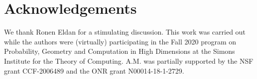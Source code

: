 \documentclass[11pt]{article}
\numberwithin{equation}{section}
\theoremstyle{myremark}
\theoremstyle{myremark}
\theoremstyle{myexample}
\newcommand{\1}{\mathbf{1}}
\begin{document}
\section*{Acknowledgements}

We thank Ronen Eldan for a stimulating discussion. This work was carried out 
while the authors were (virtually) participating in the Fall 2020 program on Probability, Geometry and Computation in High Dimensions at the Simons Institute for the Theory of Computing.
A.M. was partially supported by  the NSF grant CCF-2006489 and the ONR grant 
N00014-18-1-2729.

\newpage


\providecommand{\bysame}{\leavevmode\hbox to3em{\hrulefill}\thinspace}
\providecommand{\MR}{\relax\ifhmode\unskip\space\fi MR }
\providecommand{\MRhref}[2]{%
  \href{http://www.ams.org/mathscinet-getitem?mr=#1}{#2}
}
\providecommand{\href}[2]{#2}
\end{document}
